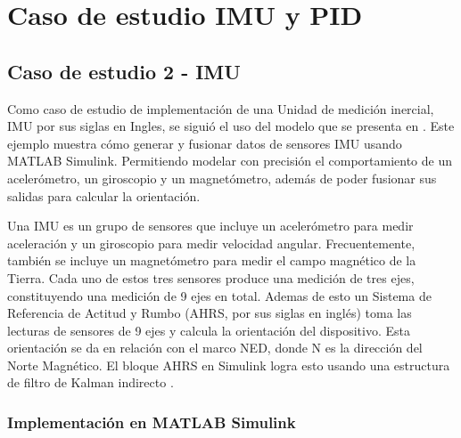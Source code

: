 \chapter{Caso de estudio IMU y PID}
\label{ch:especifico3}

\section{Caso de estudio 2 - IMU}

Como caso de estudio de implementación de una Unidad de medición inercial, IMU por sus siglas en Ingles, se siguió el uso del modelo que se presenta en \cite{mathworks2024imu}. Este ejemplo muestra cómo generar y fusionar datos de sensores IMU usando MATLAB Simulink. Permitiendo modelar con precisión el comportamiento de un acelerómetro, un giroscopio y un magnetómetro, además de poder fusionar sus salidas para calcular la orientación.

Una IMU es un grupo de sensores que incluye un acelerómetro para medir aceleración y un giroscopio para medir velocidad angular. Frecuentemente, también se incluye un magnetómetro para medir el campo magnético de la Tierra. Cada uno de estos tres sensores produce una medición de tres ejes, constituyendo una medición de 9 ejes en total. Ademas de esto un Sistema de Referencia de Actitud y Rumbo (AHRS, por sus siglas en inglés) toma las lecturas de sensores de 9 ejes y calcula la orientación del dispositivo. Esta orientación se da en relación con el marco NED, donde N es la dirección del Norte Magnético. El bloque AHRS en Simulink logra esto usando una estructura de filtro de Kalman indirecto \cite{mathworks2024imu}.

\subsection{Implementación en MATLAB Simulink}

